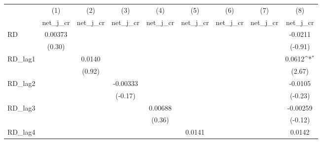{
\def\sym#1{\ifmmode^{#1}\else\(^{#1}\)\fi}
\begin{tabular}{l*{8}{c}}
\toprule
            &\multicolumn{1}{c}{(1)}&\multicolumn{1}{c}{(2)}&\multicolumn{1}{c}{(3)}&\multicolumn{1}{c}{(4)}&\multicolumn{1}{c}{(5)}&\multicolumn{1}{c}{(6)}&\multicolumn{1}{c}{(7)}&\multicolumn{1}{c}{(8)}\\
            &\multicolumn{1}{c}{net\_j\_cr}&\multicolumn{1}{c}{net\_j\_cr}&\multicolumn{1}{c}{net\_j\_cr}&\multicolumn{1}{c}{net\_j\_cr}&\multicolumn{1}{c}{net\_j\_cr}&\multicolumn{1}{c}{net\_j\_cr}&\multicolumn{1}{c}{net\_j\_cr}&\multicolumn{1}{c}{net\_j\_cr}\\
\midrule
RD          &     0.00373         &                     &                     &                     &                     &                     &                     &     -0.0211         \\
            &      (0.30)         &                     &                     &                     &                     &                     &                     &     (-0.91)         \\
\addlinespace
RD\_lag1     &                     &      0.0140         &                     &                     &                     &                     &                     &      0.0612\sym{*}  \\
            &                     &      (0.92)         &                     &                     &                     &                     &                     &      (2.67)         \\
\addlinespace
RD\_lag2     &                     &                     &    -0.00333         &                     &                     &                     &                     &     -0.0105         \\
            &                     &                     &     (-0.17)         &                     &                     &                     &                     &     (-0.23)         \\
\addlinespace
RD\_lag3     &                     &                     &                     &     0.00688         &                     &                     &                     &    -0.00259         \\
            &                     &                     &                     &      (0.36)         &                     &                     &                     &     (-0.12)         \\
\addlinespace
RD\_lag4     &                     &                     &                     &                     &      0.0141         &                     &                     &      0.0142         \\

\end{tabular}}
